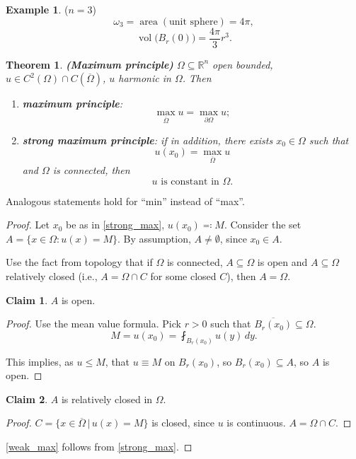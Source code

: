 \documentclass[12pt]{article}
\DeclareMathOperator{\area}{area}
\DeclareMathOperator{\vol}{vol}
\newtheorem{theorem}{Theorem}[section]
\theoremstyle{definition}
\newtheorem{claim}{Claim}
\newtheorem*{example*}{Example}
\begin{document}
\begin{example*}
($n=3$)
\[\omega_3=\area(\text{unit sphere})=4\pi,\]
\[\vol\big(B_r(0)\big)=\frac{4\pi}{3}r^3.\]
\end{example*}

\begin{theorem}
\emph{\textbf{(Maximum principle)}} $\Omega\subseteq\mathbb{R}^n$ open bounded, $u\in C^2(\Omega)\cap C(\overline{\Omega})$, $u$ harmonic in $\Omega$. Then
\begin{enumerate}[label=(\roman*)]
\item\label{weak_max} \emph{\textbf{maximum principle}}:
\[\max_{\overline{\Omega}}u=\max_{\partial\Omega}u;\]
\item\label{strong_max} \emph{\textbf{strong maximum principle}}: if in addition, there exists $x_0\in\Omega$ such that
\[u(x_0)=\max_{\overline{\Omega}}u\]
and $\Omega$ is connected, then
\[u\text{ is constant in }\Omega.\]
\end{enumerate}
\end{theorem}

Analogous statements hold for ``min'' instead of ``max''.

\begin{proof}
Let $x_0$ be as in \ref{strong_max}, $u(x_0)\eqqcolon M$. Consider the set $A=\{x\in\Omega:u(x)=M\}$. By assumption, $A\neq\emptyset$, since $x_0\in A$.

Use the fact from topology that if $\Omega$ is connected, $A\subseteq\Omega$ is open and $A\subseteq\Omega$ relatively closed (i.e., $A=\Omega\cap C$ for some closed $C$), then $A=\Omega$.

\begin{claim}
$A$ is open.
\end{claim}

\begin{proof}
Use the mean value formula. Pick $r>0$ such that $\overline{B_r(x_0)}\subseteq\Omega$.
\[M=u(x_0)=\fint_{B_r(x_0)}u(y)\,dy.\]

This implies, as $u\leq M$, that $u\equiv M$ on $B_r(x_0)$, so $B_r(x_0)\subseteq A$, so $A$ is open.
\end{proof}

\begin{claim}
$A$ is relatively closed in $\Omega$.
\end{claim}

\begin{proof}
$C=\{x\in\overline{\Omega}\,|\,u(x)=M\}$ is closed, since $u$ is continuous. $A=\Omega\cap C$.
\end{proof}

\ref{weak_max} follows from \ref{strong_max}.
\end{proof}
\end{document}
